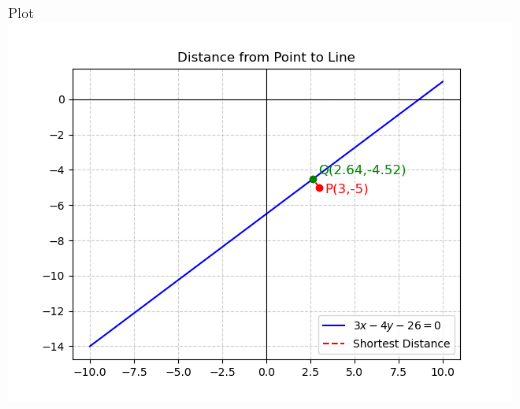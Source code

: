 \documentclass{beamer}
\begin{document}
\begin{frame}{Plot}
    \centering
    \includegraphics[width=\columnwidth, height=0.8\textheight, keepaspectratio]{Figure_7.png}     
\end{frame}
\end{document}
